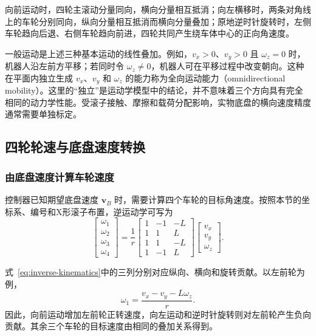 \documentclass[UTF8,zihao=-4]{ctexart}
\newcommand{\vect}[1]{\bm{#1}}
\begin{document}
向前运动时，四轮主滚动分量同向，横向分量相互抵消；向左横移时，两条对角线上的车轮分别同向，纵向分量相互抵消而横向分量叠加；原地逆时针旋转时，左侧车轮趋向后退、右侧车轮趋向前进，四轮共同产生绕车体中心的正向角速度。

一般运动是上述三种基本运动的线性叠加。例如，$v_x>0$、$v_y>0$ 且 $\omega_z=0$ 时，机器人沿左前方平移；若同时令 $\omega_z\neq0$，机器人可在平移过程中改变朝向。这种在平面内独立生成 $v_x$、$v_y$ 和 $\omega_z$ 的能力称为全向运动能力（omnidirectional mobility）。这里的“独立”是运动学模型中的结论，并不意味着三个方向具有完全相同的动力学性能。受滚子接触、摩擦和载荷分配影响，实物底盘的横向速度精度通常需要单独标定。

\subsection{四轮轮速与底盘速度转换}

\subsubsection{由底盘速度计算车轮速度}

控制器已知期望底盘速度 $\vect{v}_B$ 时，需要计算四个车轮的目标角速度。按照本节的坐标系、编号和X形滚子布置，逆运动学可写为
\begin{equation}
  \begin{bmatrix}
    \omega_1\\
    \omega_2\\
    \omega_3\\
    \omega_4
  \end{bmatrix}
  =
  \frac{1}{r}
  \begin{bmatrix}
    1 & -1 & -L\\
    1 &  1 &  L\\
    1 &  1 & -L\\
    1 & -1 &  L
  \end{bmatrix}
  \begin{bmatrix}
    v_x\\
    v_y\\
    \omega_z
  \end{bmatrix}.
  \label{eq:inverse-kinematics}
\end{equation}

式~\eqref{eq:inverse-kinematics}中的三列分别对应纵向、横向和旋转贡献。以左前轮为例，
\begin{equation}
  \omega_1=\frac{v_x-v_y-L\omega_z}{r}.
\end{equation}
因此，向前运动增加左前轮正转速度，向左运动和逆时针旋转则对左前轮产生负向贡献。其余三个车轮的目标速度由相同的叠加关系得到。
\end{document}
